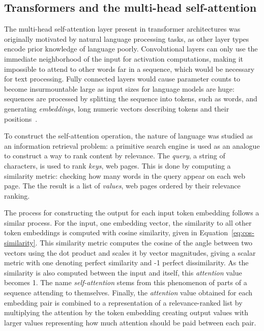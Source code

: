 \documentclass[english,twoside,openright]{UH_DS_MSc}
\begin{document}
\subsection{Transformers and the multi-head self-attention}

The multi-head self-attention layer present in transformer architectures was
originally motivated by natural language processing tasks, as other layer types
encode prior knowledge of language poorly.
Convolutional layers can only use the immediate neighborhood of the input for activation computations, making it impossible to attend to other words far in a sequence, which would be necessary for text processing. Fully connected layers would cause parameter counts to become insurmountable large as input sizes for language models are huge: sequences are processed by splitting the sequence into tokens, such as words, and generating \textit{embeddings}, long numeric vectors describing tokens and their positions~\cite{princebook}.

To construct the self-attention operation, the nature of language was studied 
as an information retrieval problem: a primitive search engine is used as an analogue to construct a way to rank content by relevance.
The \textit{query}, a string of characters, is used to rank \textit{keys}, web pages. This is done by computing a similarity metric: checking how many words in the query appear on each web page. The
the result is a list of \textit{values}, web pages ordered by their relevance ranking.

The process for constructing the output for each input token embedding follows a similar process.
For the input, one embedding vector, the similarity to all other token embeddings is computed with cosine similarity, given in Equation~\ref{eq:cos-similarity}. This similarity metric computes the cosine of the angle between two vectors using the dot product and scales it by vector magnitudes,
 giving a scalar metric with one denoting perfect similarity and -1 perfect dissimilarity. As the similarity is also computed between the input and itself, this \textit{attention} value becomes 1.
The name \textit{self-attention} stems from this phenomenon of parts of a sequence attending to themselves. Finally, the \textit{attention} value obtained for each embedding pair is combined to a representation of a relevance-ranked list by multiplying the attention by the token embedding creating output values with larger values representing how much attention should be paid between each pair.
\end{document}

